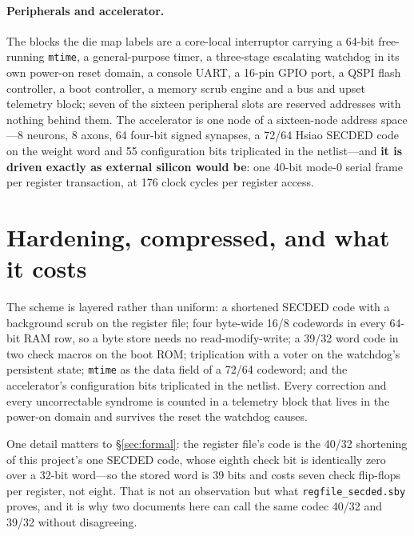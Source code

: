 \documentclass[11pt,a4paper]{article}
\newcommand{\file}[1]{\texttt{\small #1}}
\begin{document}
\paragraph{Peripherals and accelerator.} The blocks the die map labels
are a core-local interruptor carrying a \num{64}-bit free-running
\texttt{mtime}, a general-purpose timer, a three-stage escalating
watchdog in its own power-on reset domain, a console UART, a
\num{16}-pin GPIO port, a QSPI flash controller, a boot controller, a
memory scrub engine and a bus and upset telemetry block; seven of the
sixteen peripheral slots are reserved addresses with nothing behind
them. The accelerator is one node of a sixteen-node address space---\num{8}
neurons, \num{8} axons, \num{64} four-bit signed synapses, a
\num{72}/\num{64} Hsiao SECDED code on the weight word and \num{55}
configuration bits triplicated in the netlist---and \textbf{it is
driven exactly as external silicon would be}: one \num{40}-bit mode-0
serial frame per register transaction, at \num{176} clock cycles per
register access.

\section{Hardening, compressed, and what it costs}
\label{sec:harden}

The scheme is layered rather than uniform: a shortened SECDED code with
a background scrub on the register file; four byte-wide
\num{16}/\num{8} codewords in every \num{64}-bit RAM row, so a byte
store needs no read-modify-write; a \num{39}/\num{32} word code in two
check macros on the boot ROM; triplication with a voter on the
watchdog's persistent state; \texttt{mtime} as the data field of a
\num{72}/\num{64} codeword; and the accelerator's configuration bits
triplicated in the netlist. Every correction and every uncorrectable
syndrome is counted in a telemetry block that lives in the power-on
domain and survives the reset the watchdog causes.

One detail matters to \S\ref{sec:formal}: the register file's code is
the \num{40}/\num{32} shortening of this project's one SECDED code,
whose eighth check bit is identically zero over a \num{32}-bit
word---so the stored word is \num{39} bits and costs seven check
flip-flops per register, not eight. That is not an observation but what
\file{regfile\_secded.sby} proves, and it is why two documents here can
call the same codec \num{40}/\num{32} and \num{39}/\num{32} without
disagreeing.
\end{document}
